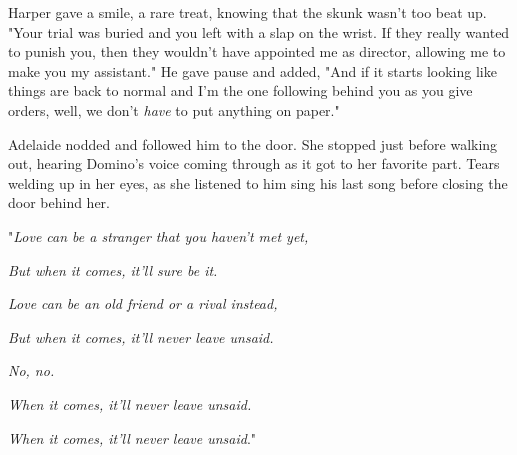 Harper gave a smile, a rare treat, knowing that the skunk wasn't too beat up. "Your trial was buried and you left with a slap on the wrist. If they really wanted to punish you, then they wouldn't have appointed me as director, allowing me to make you my assistant." He gave pause and added, "And if it starts looking like things are back to normal and I'm the one following behind you as you give orders, well, we don't \emph{have} to put anything on paper."

Adelaide nodded and followed him to the door. She stopped just before walking out, hearing Domino's voice coming through as it got to her favorite part. Tears welding up in her eyes, as she listened to him sing his last song before closing the door behind her.

"\emph{Love can be a stranger that you haven't met yet,}

\emph{But when it comes, it'll sure be it.}

\emph{Love can be an old friend or a rival instead,}

\emph{But when it comes, it'll never leave unsaid.}

\emph{No, no.}

\emph{When it comes, it'll never leave unsaid.}

\emph{When it comes, it'll never leave unsaid}."

